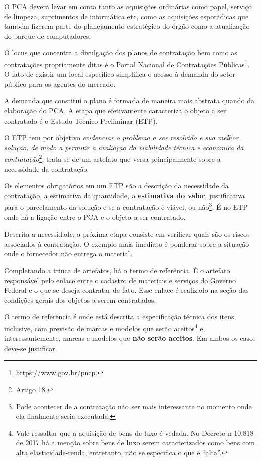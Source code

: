 O PCA deverá levar em conta tanto as aquisições ordinárias como papel, serviço de limpeza, suprimentos de informática etc, como as aquisições esporádicas que também fizerem parte do planejamento estratégico do órgão como a atualização do parque de computadores. \citet{TCE2022}

O locus que concentra a divulgação dos planos de contratação bem como as contratações propriamente ditas é o Portal Nacional de Contratações Públicas\footnote{\url{https://www.gov.br/pncp}.}. O fato de existir um local específico simplifica o acesso à demanda do setor público para os agentes do mercado.

A demanda que constitui o plano é formada de maneira mais abstrata quando da elaboração do PCA. A etapa que efetivamente caracteriza o objeto a ser contratado é o Estudo Técnico Preliminar (ETP).

O ETP tem por objetivo \emph{evidenciar o problema a ser resolvido e sua melhor solução, de modo a permitir a avaliação da viabilidade técnica e econômica da contratação}\footnote{Artigo 18.}, trata-se de um artefato que versa principalmente sobre a necessidade da contratação.

Os elementos obrigatórios em um ETP são a descrição da necessidade da contratação, a estimativa da quantidade, a \textbf{estimativa do valor}, justificativa para o parcelamento da solução e se a contratação é viável, ou não\footnote{Pode acontecer de a contratação não ser mais interessante no momento onde ela finalmente seria executada.}. É no ETP onde há a ligação entre o PCA e o objeto a ser contratado.

Descrita a necessidade, a próxima etapa consiste em verificar quais são os riscos associados à contratação. O exemplo mais imediato é ponderar sobre a situação onde o fornecedor não entrega o material.

Completando a trinca de artefatos, há o termo de referência. É o artefato responsável pelo enlace entre o cadastro de materiais e serviços do Governo Federal e o que se deseja contratar de fato. Esse enlace é realizado na seção das condições gerais dos objetos a serem contratados.

O termo de referência é onde está descrita a especificação técnica dos itens, inclusive, com previsão de marcas e modelos que serão aceitos\footnote{Vale ressaltar que a aquisição de bens de luxo é vedada. No Decreto n{\textordmasculine} 10.818 de 2017 há a menção sobre bens de luxo serem caracterizados como bens com alta elasticidade-renda, entretanto, não se especifica o que é ``alta''.} e, interessantemente, marcas e modelos que \textbf{não serão aceitos}. Em ambos os casos deve-se justificar.

